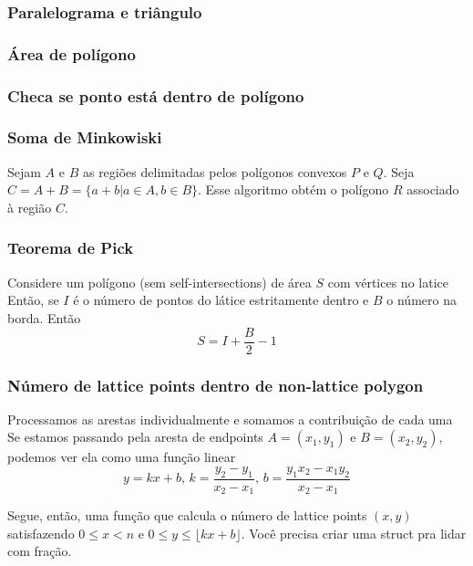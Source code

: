 \subsubsection{Paralelograma e triângulo}


\subsubsection{Área de polígono}


\subsubsection{Checa se ponto está dentro de polígono}


\subsubsection{Soma de Minkowiski}

Sejam $A$ e $B$ as regiões delimitadas pelos polígonos convexos $P$ e $Q$.
Seja $C = A + B = \{ a + b \vert a \in A, b \in B\}$. Esse algoritmo obtém
o polígono $R$ associado à região $C$.


\subsubsection{Teorema de Pick}

Considere um polígono (sem self-intersections) de área $S$ com vértices no latice 
Então, se $I$ é o número de pontos do látice estritamente dentro e $B$ o número
na borda. Então
$$ S = I + \dfrac{B}{2} - 1$$


\subsubsection{Número de lattice points dentro de non-lattice polygon}

Processamos as arestas individualmente e somamos a contribuição de cada uma
Se estamos passando pela aresta de endpoints $A=(x_1, y_1)$ e $B=(x_2, y_2)$,
podemos ver ela como uma função linear
$$y = kx + b, \, k = \dfrac{y_2 - y_1}{x_2 - x_1}, \, b = \dfrac{y_1 x_2 - x_1 y_2}{x_2 - x_1}$$

Segue, então, uma função que calcula o número de lattice points $(x, y)$ satisfazendo
$0 \leq x < n$ e $0 \leq y \leq \lfloor kx + b \rfloor$. Você precisa criar uma struct
pra lidar com fração.

